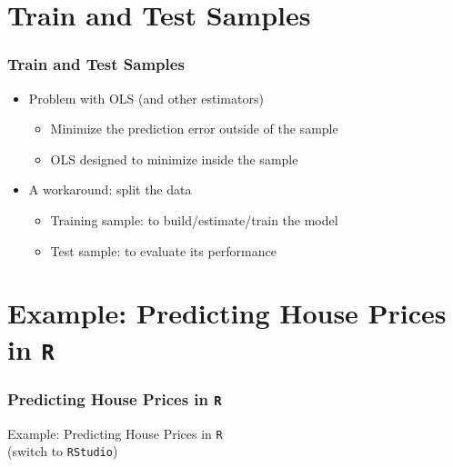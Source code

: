 \documentclass[
  shownotes,
  xcolor={svgnames},
  hyperref={colorlinks,citecolor=DarkBlue,linkcolor=DarkRed,urlcolor=DarkBlue}
  ]{beamer}
\begin{document}
\section{Train and Test Samples}
\begin{frame}
\frametitle{Train and Test Samples}


\begin{itemize}
  \item Problem with OLS (and other estimators)
  \medskip
  \begin{itemize}
    \item Minimize the prediction error outside of the sample
    \medskip
    \item OLS designed to minimize inside the sample  
  \end{itemize}
  \bigskip
  
  \item A workaround: split the data
  \medskip
  \begin{itemize}
    \item  Training sample: to build/estimate/train the model
    \medskip
    \item  Test sample:  to evaluate its performance 
  \end{itemize}
\end{itemize}

\end{frame}

\section{ Example: Predicting House Prices in \texttt{R}}
\begin{frame}
\frametitle{Predicting House Prices in \texttt{R}}

\begin{center}
\large Example: Predicting House Prices in \texttt{R} \\
(switch to \texttt{RStudio})
\end{center}


\end{frame}




\end{document}
